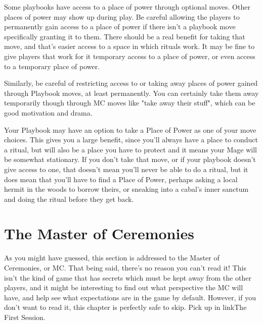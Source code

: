 \documentclass[
  oneside,
  statementpaper,
  9pt]{memoir}
\begin{document}
\begin{MC}

Some playbooks have access to a place of power through optional moves. Other places of power may show up during play. Be careful allowing the players to permanently gain access to a place of power if there isn’t a playbook move specifically granting it to them. There should be a real benefit for taking that move, and that’s easier access to a space in which rituals work. It may be fine to give players that work for it temporary access to a place of power, or even access to a temporary place of power.

Similarly, be careful of restricting access to or taking away places of power gained through Playbook moves, at least permanently. You can certainly take them away temporarily though through MC moves like "take away their stuff", which can be good motivation and drama.

\end{MC}

\begin{Player}

Your Playbook may have an option to take a Place of Power as one of your move choices. This gives you a large benefit, since you'll always have a place to conduct a ritual, but will also be a place you have to protect and it means your Mage will be somewhat stationary. If you don't take that move, or if your playbook doesn't give access to one, that doesn't mean you'll never be able to do a ritual, but it does mean that you'll have to find a Place of Power, perhaps asking a local hermit in the woods to borrow theirs, or sneaking into a cabal's inner sanctum and doing the ritual before they get back.

\end{Player}

\newpage

\hypertarget{the-master-of-ceremonies}{%
\chapter{The Master of Ceremonies}\label{the-master-of-ceremonies}}

\begin{Player}

As you might have guessed, this section is addressed to the Master of Ceremonies, or MC. That being said, there's no reason you can't read it! This isn't the kind of game that has secrets which must be kept away from the other players, and it might be interesting to find out what perspective the MC will have, and help see what expectations are in the game by default. However, if you don't want to read it, this chapter is perfectly safe to skip. Pick up in {{linkThe First Session}}.

\end{Player}
\end{document}
